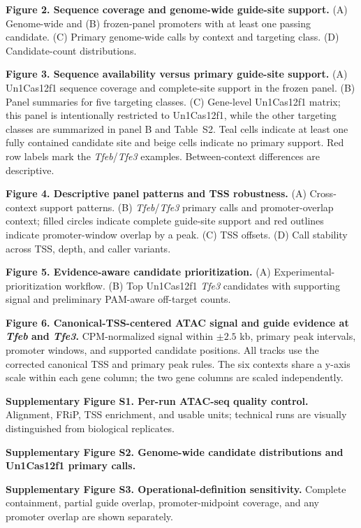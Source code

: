 \documentclass[11pt]{article}
\begin{document}
\textbf{Figure 2. Sequence coverage and genome-wide guide-site support.} (A) Genome-wide and (B) frozen-panel promoters with at least one passing candidate. (C) Primary genome-wide calls by context and targeting class. (D) Candidate-count distributions.

\textbf{Figure 3. Sequence availability versus primary guide-site support.} (A) Un1Cas12f1 sequence coverage and complete-site support in the frozen panel. (B) Panel summaries for five targeting classes. (C) Gene-level Un1Cas12f1 matrix; this panel is intentionally restricted to Un1Cas12f1, while the other targeting classes are summarized in panel B and Table~S2. Teal cells indicate at least one fully contained candidate site and beige cells indicate no primary support. Red row labels mark the \textit{Tfeb}/\textit{Tfe3} examples. Between-context differences are descriptive.

\textbf{Figure 4. Descriptive panel patterns and TSS robustness.} (A) Cross-context support patterns. (B) \textit{Tfeb}/\textit{Tfe3} primary calls and promoter-overlap context; filled circles indicate complete guide-site support and red outlines indicate promoter-window overlap by a peak. (C) TSS offsets. (D) Call stability across TSS, depth, and caller variants.

\textbf{Figure 5. Evidence-aware candidate prioritization.} (A) Experimental-prioritization workflow. (B) Top Un1Cas12f1 \textit{Tfe3} candidates with supporting signal and preliminary PAM-aware off-target counts.

\textbf{Figure 6. Canonical-TSS-centered ATAC signal and guide evidence at \textit{Tfeb} and \textit{Tfe3}.} CPM-normalized signal within $\pm2.5$ kb, primary peak intervals, promoter windows, and supported candidate positions. All tracks use the corrected canonical TSS and primary peak rules. The six contexts share a y-axis scale within each gene column; the two gene columns are scaled independently.

\textbf{Supplementary Figure S1. Per-run ATAC-seq quality control.} Alignment, FRiP, TSS enrichment, and usable units; technical runs are visually distinguished from biological replicates.

\textbf{Supplementary Figure S2. Genome-wide candidate distributions and Un1Cas12f1 primary calls.}

\textbf{Supplementary Figure S3. Operational-definition sensitivity.} Complete containment, partial guide overlap, promoter-midpoint coverage, and any promoter overlap are shown separately.
\end{document}
